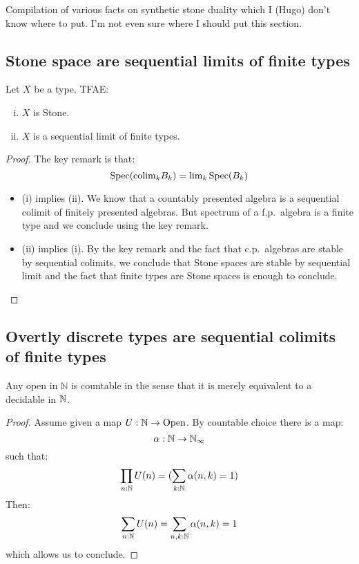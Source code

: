 Compilation of various facts on synthetic stone duality which I (Hugo) don't know where to put. I'm not even sure where I should put this section.


\subsection{Stone space are sequential limits of finite types}

\begin{lemma}
Let $X$ be a type. TFAE:
\begin{enumerate}[(i)]
\item $X$ is Stone.
\item $X$ is a sequential limit of finite types.
\end{enumerate}
\end{lemma}

\begin{proof}
The key remark is that:
\[\operatorname{Spec}(\mathrm{colim}_kB_k) = \mathrm{lim}_k\operatorname{Spec}(B_k)\]
\begin{itemize}
\item (i) implies (ii). We know that a countably presented algebra is a sequential colimit of finitely presented algebras. But spectrum of a f.p.\ algebra is a finite type and we conclude using the key remark.
\item (ii) implies (i). By the key remark and the fact that c.p.\ algebras are stable by sequential colimits, we conclude that Stone spaces are stable by sequential limit and the fact that finite types are Stone spaces is enough to conclude.
\end{itemize}
\end{proof}


\subsection{Overtly discrete types are sequential colimits of finite types}

\begin{lemma}\label{open-in-N-pseudo-countable}
Any open in $\mathbb{N}$ is countable in the sense that it is merely equivalent to a decidable in $\mathbb{N}$.
\end{lemma}

\begin{proof}
Assume given a map $U:\mathbb{N}\to\mathrm{Open}$. By countable choice there is a map:
\[\alpha:\mathbb{N}\to \mathbb{N}_\infty\]
such that:
\[\prod_{n:\mathbb{N}} U(n) = (\sum_{k:\mathbb{N}} \alpha(n,k) = 1)\]
Then:
\[\sum_{n:\mathbb{N}}U(n) = \sum_{n,k:\mathbb{N}}\alpha(n,k) = 1\]
which allows us to conclude.
\end{proof}

